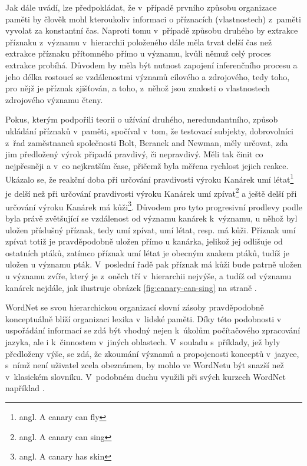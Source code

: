 \documentclass[a4paper, 11pt, oneside, showtrims]{book}
\newcommand\ex{\textsf}
\begin{document}
				Jak \textcite{collins1969retrieval} dále uvádí, lze předpokládat, že v~případě prvního způsobu organizace paměti by člověk mohl kteroukoliv informaci o příznacích (vlastnostech) z~paměti vyvolat za konstantní čas. Naproti tomu v~případě způsobu druhého by extrakce příznaku z~významu v~hierarchii položeného dále měla trvat delší čas než extrakce příznaku přítomného přímo u významu, kvůli němuž celý proces extrakce probíhá. Důvodem by měla být nutnost zapojení inferenčního procesu a jeho délka rostoucí se vzdálenostmi významů cílového a zdrojového, tedy toho, pro nějž je příznak zjišťován, a toho, z~něhož jsou znalosti o vlastnostech zdrojového významu čteny.

				Pokus, kterým podpořili \textcite{collins1969retrieval} teorii o užívání druhého, neredundantního, způsob ukládání příznaků v~paměti, spočíval v~tom, že testovací subjekty, dobrovolníci z~řad zaměstnanců společnosti Bolt, Beranek and Newman, měly určovat, zda jim předložený výrok připadá pravdivý, či nepravdivý. Měli tak činit co nejpřesněji a v~co nejkratším čase, přičemž byla měřena rychlost jejich reakce. Ukázalo se, že reakční doba při určování pravdivosti výroku \ex{Kanárek umí létat}\footnote{angl. \ex{A canary can fly}} je delší než při určování pravdivosti výroku \ex{Kanárek umí zpívat}\footnote{angl. \ex{A canary can sing}} a ještě delší při určování výroku \ex{Kanárek má kůži}\footnote{angl. \ex{A canary has skin}}. Důvodem pro tyto progresivní prodlevy podle \textcite{collins1969retrieval} byla právě zvětšující se vzdálenost od významu \ex{kanárek} k~významu, u něhož byl uložen příslušný příznak, tedy \ex{umí zpívat}, \ex{umí létat}, resp. \ex{má kůži}. Příznak \ex{umí zpívat} totiž je pravděpodobně uložen přímo u \ex{kanárka}, jelikož jej odlišuje od ostatních ptáků, zatímco příznak \ex{umí létat} je obecným znakem ptáků, tudíž je uložen u významu \ex{pták}. V~poslední řadě pak příznak \ex{má kůži} bude patrně uložen u významu \ex{zvíře}, který je z~oněch tří v~hierarchii nejvýše, a tudíž od významu \ex{kanárek} nejdále, jak ilustruje obrázek \ref{fig:canary-can-sing} na straně \pageref{fig:canary-can-sing}.

				WordNet se svou hierarchickou organizací slovní zásoby pravděpodobně konceptuálně blíží organizaci lexika v~lidské paměti. Díky této podobnosti v uspořádání informací se zdá být vhodný nejen k~úkolům počítačového zpracování jazyka, ale i k~činnostem v~jiných oblastech. V~souladu s~příklady, jež byly předloženy výše, se zdá, že zkoumání významů a propojenosti konceptů v~jazyce, s~nímž není uživatel zcela obeznámen, by mohlo ve WordNetu být snazší než v~klasickém slovníku. V~podobném duchu využili při svých kurzech WordNet například \textcite{lemnitzer2003using}.
			
\end{document}

